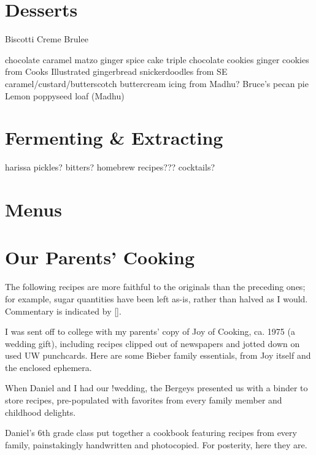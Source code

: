 \documentclass{article}
\begin{document}
\section{Desserts}
Biscotti
Creme Brulee


chocolate caramel matzo
ginger spice cake
triple chocolate cookies
ginger cookies from Cooks Illustrated
gingerbread
snickerdoodles from SE
caramel/custard/butterscotch
buttercream icing from Madhu?
Bruce's pecan pie
Lemon poppyseed loaf (Madhu)

\section{Fermenting \& Extracting}
harissa
pickles?
bitters?
homebrew recipes??? cocktails?

\section{Menus}


\section{Our Parents' Cooking}
The following recipes are more faithful to the originals than the preceding ones; for example, sugar quantities have been left as-is, rather than halved as I would. Commentary is indicated by [].

I was sent off to college with my parents' copy of Joy of Cooking, ca. 1975 (a wedding gift), including recipes clipped out of newspapers and jotted down on used UW punchcards. Here are some Bieber family essentials, from Joy itself and the enclosed ephemera.


When Daniel and I had our !wedding, the Bergeys presented us with a binder to store recipes, pre-populated with favorites from every family member and childhood delights.
% 

Daniel's 6th grade class put together a cookbook featuring recipes from every family, painstakingly handwritten and photocopied. For posterity, here they are.
% 

\printindex
\end{document}
